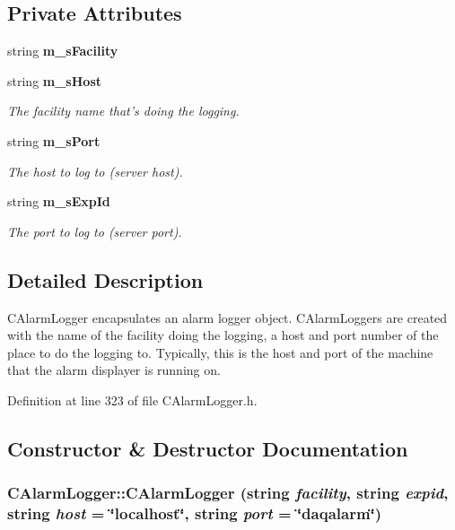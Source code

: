 \subsection*{Private Attributes}
\begin{CompactItemize}
\item 
string {\bf m\_\-s\-Facility}
\item 
string {\bf m\_\-s\-Host}
\begin{CompactList}\small\item\em The facility name that's doing the logging.\item\end{CompactList}\item 
string {\bf m\_\-s\-Port}
\begin{CompactList}\small\item\em The host to log to (server host).\item\end{CompactList}\item 
string {\bf m\_\-s\-Exp\-Id}
\begin{CompactList}\small\item\em The port to log to (server port).\item\end{CompactList}\end{CompactItemize}


\subsection{Detailed Description}
CAlarm\-Logger encapsulates an alarm logger object. CAlarm\-Loggers are created with the name of the facility doing the logging, a host and port number of the place to do the logging to. Typically, this is the host and port of the machine that the alarm displayer is running on. 



Definition at line 323 of file CAlarm\-Logger.h.

\subsection{Constructor \& Destructor Documentation}
\subsubsection{\setlength{\rightskip}{0pt plus 5cm}CAlarm\-Logger::CAlarm\-Logger (string {\em facility}, string {\em expid}, string {\em host} = \char`\"{}localhost\char`\"{}, string {\em port} = \char`\"{}daqalarm\char`\"{})}\label{classCAlarmLogger_a0}


